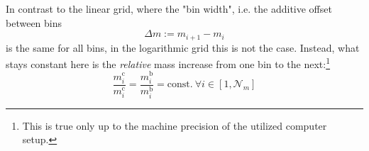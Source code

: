         In contrast to the linear grid, where the "bin width", i.e. the additive offset between bins
        \begin{equation}
            \Delta m := m_{i+1} - m_i
        \end{equation}
        is the same for all bins, in the logarithmic grid this is not the case. Instead, what stays
        constant here is the \textit{relative} mass increase from one bin to the next:\footnote{This
        is true only up to the machine precision of the utilized computer setup.}
        \begin{equation}
            \frac{m_i^\text{c}}{m_i^\text{c}}
                =\frac{m_i^\text{b}}{m_i^\text{b}}
                =\text{const.}\ \forall i\in[1,\mathcal N_m]
        \end{equation}

